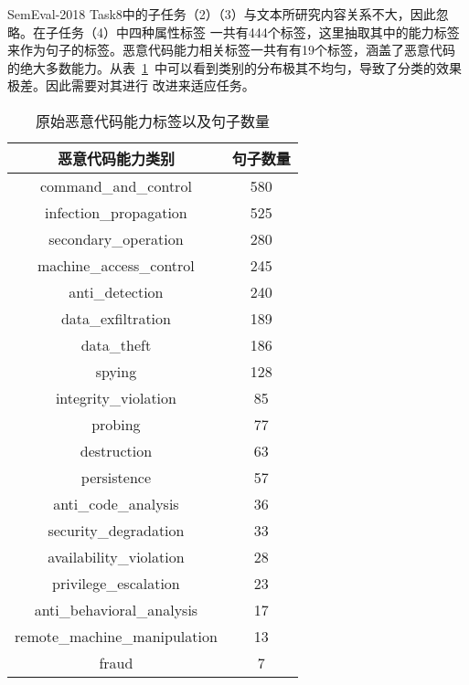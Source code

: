 SemEval-2018 Task8中的子任务（2）（3）与文本所研究内容关系不大，因此忽略。在子任务（4）中四种属性标签
一共有444个标签，这里抽取其中的能力标签来作为句子的标签。恶意代码能力相关标签一共有有19个标签，涵盖了恶意代码
的绝大多数能力。从表~\ref{tab:orgcap}~中可以看到类别的分布极其不均匀，导致了分类的效果极差。因此需要对其进行
改进来适应任务。
\begin{table}[htb]
	\renewcommand{\arraystretch}{1.3}
	\caption{原始恶意代码能力标签以及句子数量}
	\label{tab:orgcap}
	\vspace{0.5em}\centering\wuhao
	\begin{tabular}{c c}
		\toprule  恶意代码能力类别 & 句子数量  \\
		\midrule[1pt] 
		command\_and\_control & 580 \\
		infection\_propagation & 525 \\ 
		secondary\_operation & 280 \\ 
		machine\_access\_control & 245 \\ 
		anti\_detection & 240 \\ 
		data\_exfiltration & 189 \\ 
		data\_theft & 186 \\ 
		spying & 128 \\ 
		integrity\_violation & 85 \\
		probing & 77 \\ 
		destruction & 63 \\ 
		persistence & 57 \\ 
		anti\_code\_analysis & 36 \\ 
		security\_degradation & 33 \\ 
		availability\_violation & 28 \\ 
		privilege\_escalation & 23 \\ 
		anti\_behavioral\_analysis & 17 \\ 
		remote\_machine\_manipulation & 13 \\ 
		fraud & 7 \\ 
		 \bottomrule[1.5pt] 
	\end{tabular}
\end{table}

